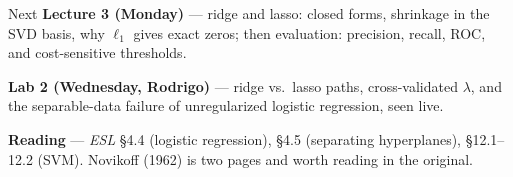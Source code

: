 \documentclass[11pt,aspectratio=169]{beamer}
\begin{document}
\begin{frame}{Next}
\textbf{Lecture 3 (Monday)} --- ridge and lasso: closed forms, shrinkage in the SVD basis, why $\ell_1$
gives exact zeros; then evaluation: precision, recall, ROC, and cost-sensitive thresholds.
\vspace{8pt}

\textbf{Lab 2 (Wednesday, Rodrigo)} --- ridge vs.\ lasso paths, cross-validated $\lambda$, and the
separable-data failure of unregularized logistic regression, seen live.
\vspace{8pt}

\textbf{Reading} --- \emph{ESL} \S4.4 (logistic regression), \S4.5 (separating hyperplanes),
\S12.1--12.2 (SVM). Novikoff (1962) is two pages and worth reading in the original.
\end{frame}
\end{document}
